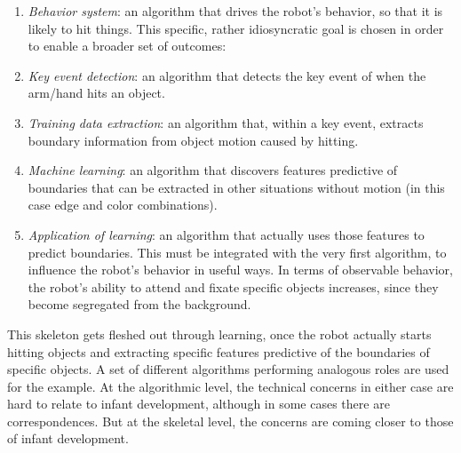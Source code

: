 \begin{enumerate} \pflist

\item {\em Behavior system}: an algorithm that drives the robot's
behavior, so that it is likely to hit things.  This specific, rather
idiosyncratic goal is chosen in order to enable a broader set of 
outcomes:

\item {\em Key event detection}: an algorithm that detects the key event of
when the arm/hand hits an object.

\item {\em Training data extraction}: an algorithm that, within a key event,
extracts boundary information from object motion caused by hitting.

\item {\em Machine learning}: an algorithm that discovers features
predictive of boundaries that can be extracted in other situations
without motion (in this case edge and color combinations).

\item {\em Application of learning}: an algorithm that actually uses
those features to predict boundaries.  This must be integrated with
the very first algorithm, to influence the robot's behavior in useful
ways.  In terms of observable behavior, the robot's ability to attend
and fixate specific objects increases, since they become segregated from
the background.

\end{enumerate}

\noindent
This skeleton gets fleshed out through learning, once the
robot actually starts hitting objects and extracting specific features
predictive of the boundaries of specific objects.  
%
A set of different algorithms performing analogous roles are used
for the  example.
%
%
At the algorithmic level, the technical concerns 
in either
case are hard to relate to
infant development, although in some cases there are correspondences.
%
But at the skeletal level, the concerns are coming closer to those of
infant development.

%


